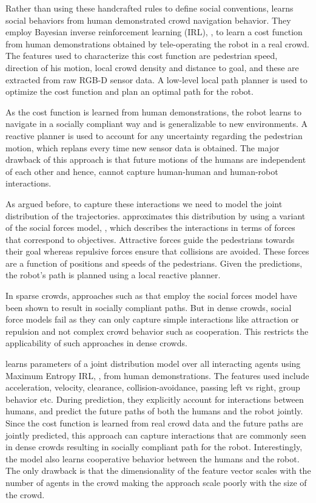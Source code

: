 Rather than using these handcrafted rules to define social conventions, \cite{kim2016socially} learns social behaviors from human demonstrated crowd navigation behavior. They employ Bayesian inverse reinforcement learning (IRL), \cite{Ramachandran2007BayesianIR}, to learn a cost function from human demonstrations obtained by tele-operating the robot in a real crowd. The features used to characterize this cost function are pedestrian speed, direction of his motion, local crowd density and distance to goal, and these are extracted from raw RGB-D sensor data. A low-level local path planner is used to optimize the cost function and plan an optimal path for the robot.

As the cost function is learned from human demonstrations, the robot learns to navigate in a socially compliant way and is generalizable to new environments. A reactive planner is used to account for any uncertainty regarding the pedestrian motion, which replans every time new sensor data is obtained. The major drawback of this approach is that future motions of the humans are independent of each other and hence, cannot capture human-human and human-robot interactions.

As argued before, to capture these interactions we need to model the joint distribution of the trajectories. \cite{shiomi2014towards} approximates this distribution by using a variant of the social forces model, \cite{helbing95}, which describes the interactions in terms of forces that correspond to objectives. Attractive forces guide the pedestrians towards their goal whereas repulsive forces ensure that collisions are avoided. These forces are a function of positions and speeds of the pedestrians. Given the predictions, the robot's path is planned using a local reactive planner.

In sparse crowds, approaches such as \cite{shiomi2014towards} that employ the social forces model have been shown to result in socially compliant paths. But in dense crowds, social force models fail as they can only capture simple interactions like attraction or repulsion and not complex crowd behavior such as cooperation. This restricts the applicability of such approaches in dense crowds.

\cite{Kretzschmar16} learns parameters of a joint distribution model over all interacting agents using Maximum Entropy IRL, \cite{Ziebart2008MaximumEI}, from human demonstrations. The features used include acceleration, velocity, clearance, collision-avoidance, passing left vs right, group behavior etc. During prediction, they explicitly account for interactions between humans, and predict the future paths of both the humans and the robot jointly. Since the cost function is learned from real crowd data and the future paths are jointly predicted, this approach can capture interactions that are commonly seen in dense crowds resulting in socially compliant path for the robot. Interestingly, the model also learns cooperative behavior between the humans and the robot. The only drawback is that the dimensionality of the feature vector scales with the number of agents in the crowd making the approach scale poorly with the size of the crowd.


